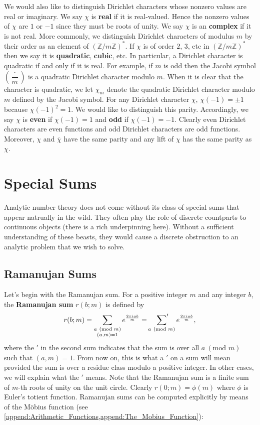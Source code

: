 \documentclass[12pt]{book}
\theoremstyle{definition}\newframedtheorem{method}{Method}
\newcommand{\psum}{\sideset{}{'}\sum}
\newcommand{\legendre}[2]{\genfrac{(}{)}{0.5pt}{0}{#1}{#2}}
\newcommand{\tmod}[1]{\ \left(\text{mod }#1\right)}
\newcommand{\Z}{\mathbb{Z}}
\newcommand{\<}{\langle}
\renewcommand{\>}{\rangle}
\newcommand{\conj}{\overline}
\newcommand{\cchi}{\conj{\chi}}
\begin{document}
    We would also like to distinguish Dirichlet characters whose nonzero values are real or imaginary. We say $\chi$ is \textbf{real} if it is real-valued. Hence the nonzero values of $\chi$ are $1$ or $-1$ since they must be roots of unity. We say $\chi$ is an \textbf{complex} if it is not real. More commonly, we distinguish Dirichlet characters of modulus $m$ by their order as an element of $(\Z/m\Z)^{\ast}$. If $\chi$ is of order $2$, $3$, etc in $(\Z/m\Z)^{\ast}$ then we say it is \textbf{quadratic}, \textbf{cubic}, etc. In particular, a Dirichlet character is quadratic if and only if it is real. For example, if $m$ is odd then the Jacobi symbol $\legendre{\cdot}{m}$ is a quadratic Dirichlet character modulo $m$. When it is clear that the character is quadratic, we let $\chi_{m}$ denote the quadratic Dirichlet character modulo $m$ defined by the Jacobi symbol. For any Dirichlet character $\chi$, $\chi(-1) = \pm 1$ because $\chi(-1)^{2} = 1$. We would like to distinguish this parity. Accordingly, we say $\chi$ is \textbf{even} if $\chi(-1) = 1$ and \textbf{odd} if $\chi(-1) = -1$. Clearly even Dirichlet characters are even functions and odd Dirichlet characters are odd functions. Moreover, $\chi$ and $\cchi$ have the same parity and any lift of $\chi$ has the same parity as $\chi$.
  \section{Special Sums}
    Analytic number theory does not come without its class of special sums that appear natrually in the wild. They often play the role of discrete countparts to continuous objects (there is a rich underpinning here). Without a sufficient understanding of these beasts, they would cause a discrete obstruction to an analytic problem that we wish to solve.
    \subsection*{Ramanujan Sums}
      Let's begin with the Ramanujan sum. For a positive integer $m$ and any integer $b$, the \textbf{Ramanujan sum} $r(b;m)$ is defined by
      \[
        r(b;m) = \sum_{\substack{a \tmod{m} \\ (a,m) = 1}}e^{\frac{2\pi iab}{m}} = \psum_{a \tmod{m}}e^{\frac{2\pi iab}{m}},
      \]
      where the $'$ in the second sum indicates that the sum is over all $a \tmod{m}$ such that $(a,m) = 1$. From now on, this is what a $'$ on a sum will mean provided the sum is over a residue class modulo a positive integer. In other cases, we will explain what the $'$ means. Note that the Ramanujan sum is a finite sum of $m$-th roots of unity on the unit circle. Clearly $r(0;m) = \phi(m)$ where $\phi$ is Euler's totient function. Ramanujan sums can be computed explicitly by means of the M\"obius function (see \cref{append:Arithmetic_Functions,append:The_Mobius_Function}):
\end{document}
